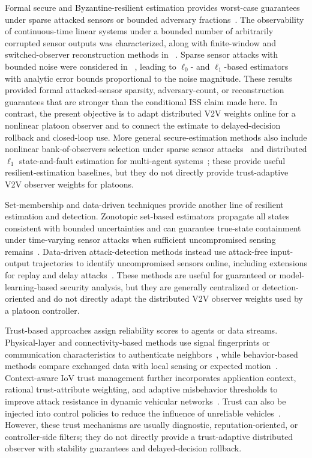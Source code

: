 \documentclass[letterpaper,journal]{IEEEtran}
\begin{document}
Formal secure and Byzantine-resilient estimation provides worst-case guarantees under sparse attacked sensors or bounded adversary fractions~\cite{fawzi2014secure,mitra2018byzantine,khazraei2020attack_auth}. The observability of continuous-time linear systems under a bounded number of arbitrarily corrupted sensor outputs was characterized, along with finite-window and switched-observer reconstruction methods in ~\cite{chong2015observability}. Sparse sensor attacks with bounded noise were considered in ~\cite{pajic2017attack_resilient}, leading to $\ell_0$- and $\ell_1$-based estimators with analytic error bounds proportional to the noise magnitude. These results provided formal attacked-sensor sparsity, adversary-count, or reconstruction guarantees that are stronger than the conditional ISS claim made here. In contrast, the present objective is to adapt distributed V2V weights online for a nonlinear platoon observer and to connect the estimate to delayed-decision rollback and closed-loop use. More general secure-estimation methods also include nonlinear bank-of-observers selection under sparse sensor attacks~\cite{chong2021secure} and distributed $\ell_1$ state-and-fault estimation for multi-agent systems~\cite{hashimoto2020distributed_l1}; these provide useful resilient-estimation baselines, but they do not directly provide trust-adaptive V2V observer weights for platoons.

Set-membership and data-driven techniques provide another line of resilient estimation and detection. Zonotopic set-based estimators propagate all states consistent with bounded uncertainties and can guarantee true-state containment under time-varying sensor attacks when sufficient uncompromised sensing remains~\cite{niazi2023resilient_set}. Data-driven attack-detection methods instead use attack-free input-output trajectories to identify uncompromised sensors online, including extensions for replay and delay attacks~\cite{coimbatore2025data_driven_attack}. These methods are useful for guaranteed or model-learning-based security analysis, but they are generally centralized or detection-oriented and do not directly adapt the distributed V2V observer weights used by a platoon controller.

Trust-based approaches assign reliability scores to agents or data streams. Physical-layer and connectivity-based methods use signal fingerprints or communication characteristics to authenticate neighbors~\cite{trust_physic_connecte,KF_chisquare_meusure}, while behavior-based methods compare exchanged data with local sensing or expected motion~\cite{trust_simple,trust_complex}. Context-aware IoV trust management further incorporates application context, rational trust-attribute weighting, and adaptive misbehavior thresholds to improve attack resistance in dynamic vehicular networks~\cite{siddiqui2023trust_vehicles}. Trust can also be injected into control policies to reduce the influence of unreliable vehicles~\cite{self-belive,Enhancing_control_trust}. However, these trust mechanisms are usually diagnostic, reputation-oriented, or controller-side filters; they do not directly provide a trust-adaptive distributed observer with stability guarantees and delayed-decision rollback.
\end{document}
